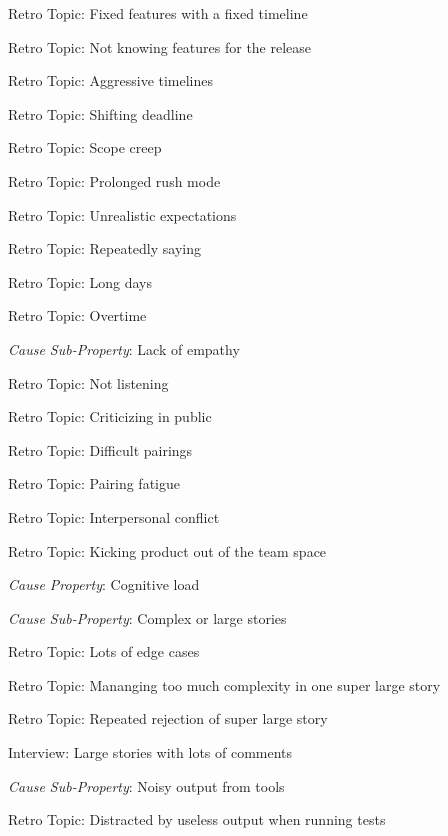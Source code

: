 \quad \quad \quad \quad Retro Topic: Fixed features with a fixed timeline

\quad \quad \quad \quad Retro Topic: Not knowing features for the release

\quad \quad \quad \quad Retro Topic: Aggressive timelines

\quad \quad \quad \quad Retro Topic: Shifting deadline

\quad \quad \quad \quad Retro Topic: Scope creep

\quad \quad \quad \quad Retro Topic: Prolonged rush mode

\quad \quad \quad \quad Retro Topic: Unrealistic expectations

\quad \quad \quad \quad Retro Topic: Repeatedly saying 

\quad \quad \quad \quad Retro Topic: Long days

\quad \quad \quad \quad Retro Topic: Overtime

\quad \quad \quad \textit{Cause Sub-Property}: Lack of empathy

\quad \quad \quad \quad Retro Topic: Not listening

\quad \quad \quad \quad Retro Topic: Criticizing in public

\quad \quad \quad \quad Retro Topic: Difficult pairings

\quad \quad \quad \quad Retro Topic: Pairing fatigue

\quad \quad \quad \quad Retro Topic: Interpersonal conflict

\quad \quad \quad \quad Retro Topic: Kicking product out of the team space

\quad \quad \textit{Cause Property}: Cognitive load

\quad \quad \quad \textit{Cause Sub-Property}: Complex or large stories

\quad \quad \quad \quad Retro Topic: Lots of edge cases

\quad \quad \quad \quad Retro Topic: Mananging too much complexity in one super large story

\quad \quad \quad \quad Retro Topic: Repeated rejection of super large story

\quad \quad \quad \quad Interview: Large stories with lots of comments

\quad \quad \quad \textit{Cause Sub-Property}: Noisy output from tools

\quad \quad \quad \quad Retro Topic: Distracted by useless output when running tests


